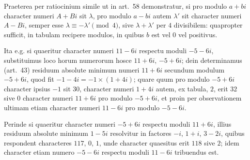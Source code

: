 \documentclass[12pt]{article}
\begin{document}
Praeterea per ratiocinium simile ut in art.~58 demonstratur, si pro modulo $a+bi$ character numeri $A+Bi$ sit $\lambda$, pro modulo $a-bi$ autem $\lambda'$ sit character numeri $A-Bi$, semper esse $\lambda\equiv-\lambda'\pmod 4$, sive $\lambda+\lambda'$ per $4$ divisibilem: quapropter sufficit, in tabulam recipere modulos, in quibus $b$ est vel $0$ vel positivus.

Ita e.g. si quaeritur character numeri $11-6i$ respectu moduli $-5-6i$, substituimus loco horum numerorum hosce $11+6i$, $-5+6i$; dein determinamus (art.~43) residuum absolute minimum numeri $11+6i$ secundum modulum $-5+6i$, quod fit $-1-4i=-1\times(1+4i)$; quare quum pro modulo $-5+6i$ character ipsius $-1$ sit $30$, character numeri $1+4i$ autem, ex tabula, $2$, erit $32$ sive $0$ character numeri $11+6i$ pro modulo $-5+6i$, et proin per observationem ultimam etiam character numeri $11-6i$ pro modulo $-5-6i$.

Perinde si quaeritur character numeri $-5+6i$ respectu moduli $11+6i$, illius residuum absolute minimum $1-5i$ resolvitur in factores $-i$, $1+i$, $3-2i$, quibus respondent characteres $117$, $0$, $1$, unde character quaesitus erit $118$ sive $2$; idem character etiam numero $-5-6i$ respectu moduli $11-6i$ tribuendus est.
\end{document}
